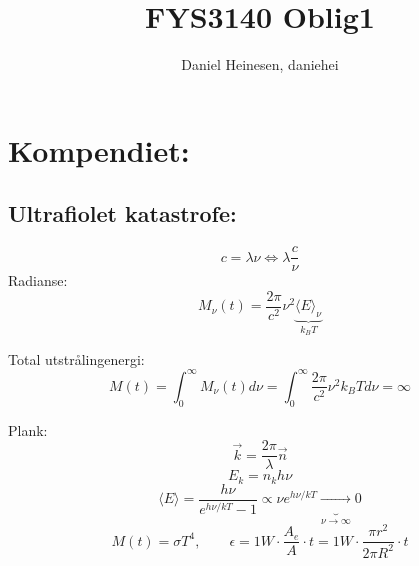 \documentclass[a4paper,norsk, 10pt]{article}
\title{FYS3140 Oblig1}
\author{Daniel Heinesen, daniehei}
\begin{document}
\section{Kompendiet:}
\subsection{Ultrafiolet katastrofe:}
\begin{equation}
c = \lambda \nu \Leftrightarrow \lambda \frac{c}{\nu}
\end{equation}
Radianse:
\begin{equation}
M_{\nu}(t) = \frac{2\pi}{c^2}\nu^2 \underbrace{\langle E\rangle_{\nu}}_{k_B T}
\end{equation}

Total utstrålingenergi:
\begin{equation}
M(t) = \int_0^{\infty} M_{\nu}(t) d\nu = \int_0^{\infty} \frac{2\pi}{c^2}\nu^2k_B T d\nu = \infty
\end{equation}

Plank:
\begin{equation}
\vec{k} = \frac{2\pi}{\lambda}\vec{n}
\end{equation}
\begin{equation}
E_k = n_k h\nu
\end{equation}
\begin{equation}
\langle E\rangle = \frac{h\nu}{e^{h\nu/kT}-1}\propto \nu e^{h\nu / kT} \underbrace{\longrightarrow}_{\nu \rightarrow \infty} 0
\end{equation}
\begin{equation}
M(t) = \sigma T^4, \qquad \epsilon =1W\cdot\frac{A_e}{A}\cdot t= 1W\cdot\frac{\pi r^2}{2\pi R^2}\cdot t
\end{equation}
\end{document}
